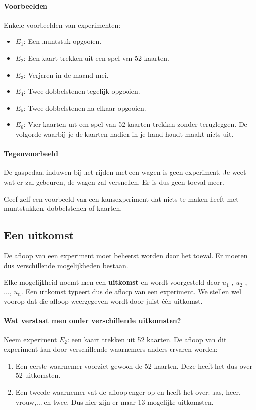 \documentclass[12pt,twoside]{article}
\begin{document}
\paragraph*{Voorbeelden} Enkele voorbeelden van experimenten:
\begin{itemize}
  \item $E_1$: Een muntstuk opgooien.
  \item $E_2$: Een kaart trekken uit een spel van 52 kaarten.
  \item $E_3$: Verjaren in de maand mei.
  \item $E_4$: Twee dobbelstenen tegelijk opgooien.
  \item $E_5$: Twee dobbelstenen na elkaar opgooien.
  \item $E_6$: Vier kaarten uit een spel van 52 kaarten trekken zonder terugleggen. De volgorde waarbij je de kaarten nadien in je hand houdt maakt niets uit.
\end{itemize}

\paragraph*{Tegenvoorbeeld}
De gaspedaal induwen bij het rijden met een wagen is geen experiment. Je weet wat er zal gebeuren, de wagen zal versnellen. Er is dus geen toeval meer.

\begin{oefening}
Geef zelf een voorbeeld van een kansexperiment dat niets te maken heeft met muntstukken, dobbelstenen of kaarten.
\end{oefening}

\subsection{Een uitkomst}

De afloop van een experiment moet beheerst worden door het toeval. Er moeten dus verschillende mogelijkheden bestaan.

Elke mogelijkheid noemt men een {\bf uitkomst} en wordt voorgesteld door $u_1$ , $u_2$ , $\ldots$, $u_n$. Een uitkomst typeert dus de afloop van een experiment. We stellen wel voorop dat die afloop weergegeven wordt door juist één uitkomst.

\paragraph*{Wat verstaat men onder verschillende uitkomsten?}

Neem experiment $E_2$: een kaart trekken uit 52 kaarten. De afloop van dit experiment
kan door verschillende waarnemers anders ervaren worden:
\begin{enumerate}
  \item Een eerste waarnemer voorziet gewoon de 52 kaarten. Deze heeft het dus over 52 uitkomsten.
  \item Een tweede waarnemer vat de afloop enger op en heeft het over: aas, heer, vrouw,... en twee. Dus hier zijn er maar 13 mogelijke uitkomsten.
\end{enumerate}
\end{document}
